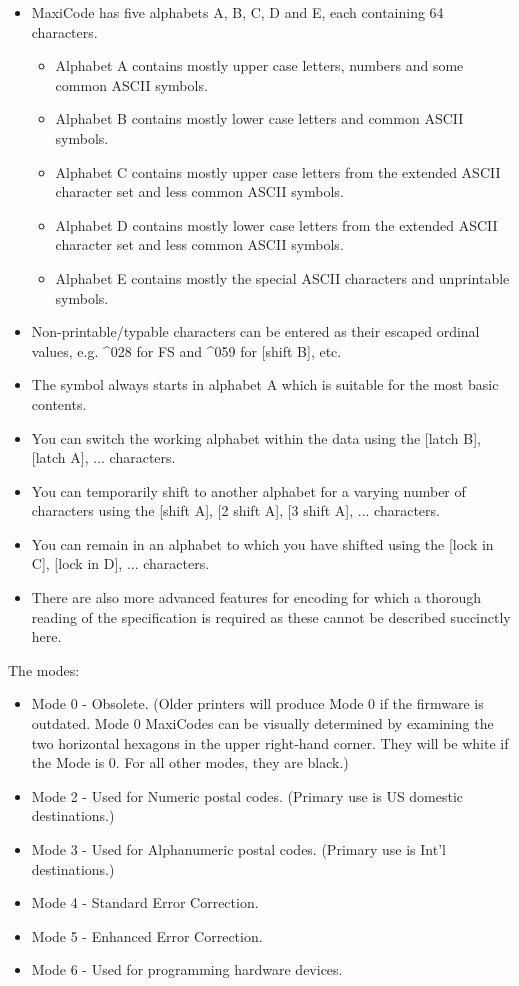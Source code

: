 \documentclass[11pt,english,BCOR10mm,DIV12,bibliography=totoc,parskip=false,smallheadings
    headexclude,footexclude,oneside]{pst-doc}
\begin{document}
\begin{itemize}
\item      MaxiCode has five alphabets A, B, C, D and E, each containing 64 characters.
\begin{itemize}
	\item Alphabet A contains mostly upper case letters, numbers and some common ASCII symbols.
    \item Alphabet B contains mostly lower case letters and common ASCII symbols.
    \item  Alphabet C contains mostly upper case letters from the extended ASCII character set and less common ASCII symbols.
    \item Alphabet D contains mostly lower case letters from the extended ASCII character set and less common ASCII symbols.
    \item Alphabet E contains mostly the special ASCII characters and unprintable symbols.
\end{itemize}
\item Non-printable/typable characters can be entered as their escaped ordinal values, e.g. \textasciicircum 028 for FS and \textasciicircum 059 for [shift B], etc.
\item  The symbol always starts in alphabet A which is suitable for the most basic contents.
\item You can switch the working alphabet within the data using the [latch B], [latch A], ... characters.
\item  You can temporarily shift to another alphabet for a varying number of characters using the [shift A], [2 shift A], [3 shift A], ... characters.
\item  You can remain in an alphabet to which you have shifted using the [lock in C], [lock in D], ... characters.
\item There are also more advanced features for encoding for which a thorough reading of the specification is required as these cannot be described succinctly here.
\end{itemize}

The modes:
\begin{itemize}
\item Mode 0 - Obsolete. (Older printers will produce Mode 0 if the firmware is outdated. Mode 0 MaxiCodes can be visually determined by examining the two horizontal hexagons in the upper right-hand corner. They will be white if the Mode is 0. For all other modes, they are black.)
\item Mode 2 - Used for Numeric postal codes. (Primary use is US domestic destinations.)
\item Mode 3 - Used for Alphanumeric postal codes. (Primary use is Int'l destinations.)
\item Mode 4 - Standard Error Correction.
\item Mode 5 - Enhanced Error Correction.
\item Mode 6 - Used for programming hardware devices.
\end{itemize}
\end{document}
